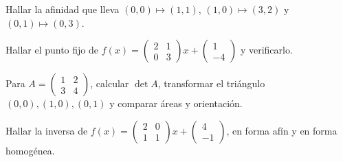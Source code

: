 \begin{ejercicio}
Hallar la afinidad que lleva \((0,0)\mapsto(1,1)\), \((1,0)\mapsto(3,2)\) y
\((0,1)\mapsto(0,3)\).
\end{ejercicio}

\begin{ejercicio}
Hallar el punto fijo de \(f(x)=\begin{pmatrix}2&1\\0&3\end{pmatrix}x+\begin{pmatrix}1\\-4\end{pmatrix}\)
y verificarlo.
\end{ejercicio}

\begin{ejercicio}
Para \(A=\begin{pmatrix}1&2\\3&4\end{pmatrix}\), calcular \(\det A\), transformar el triángulo
\((0,0),(1,0),(0,1)\) y comparar áreas y orientación.
\end{ejercicio}

\begin{ejercicio}
Hallar la inversa de \(f(x)=\begin{pmatrix}2&0\\1&1\end{pmatrix}x+\begin{pmatrix}4\\-1\end{pmatrix}\),
en forma afín y en forma homogénea.
\end{ejercicio}

